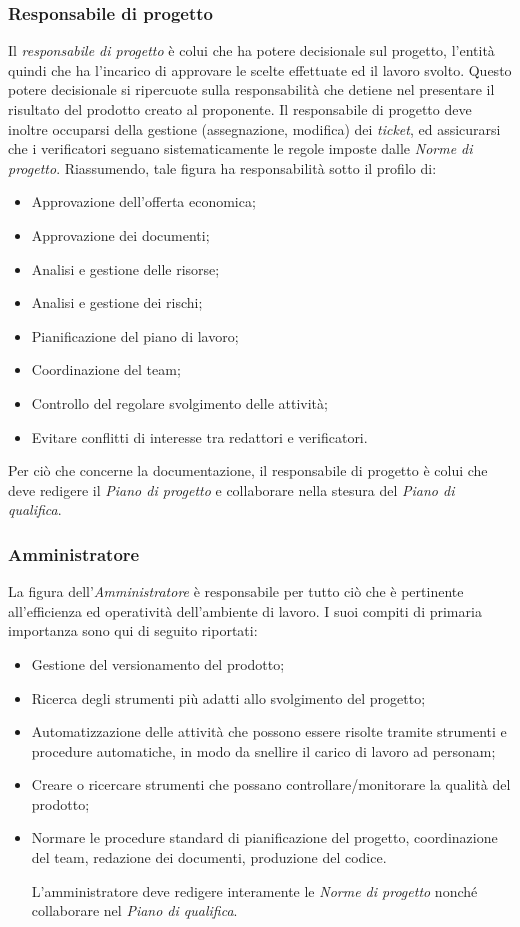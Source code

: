 \subsubsection{Responsabile di progetto}
\label{referenzaRDP}
Il \textit{responsabile di progetto} è colui che ha potere decisionale sul progetto, l'entità quindi che ha l'incarico di approvare le scelte effettuate ed il lavoro svolto. Questo potere decisionale si ripercuote sulla responsabilità che detiene nel presentare il risultato del prodotto creato al proponente.
Il responsabile di progetto deve inoltre occuparsi della gestione (assegnazione, modifica) dei \textit{ticket}, ed assicurarsi che i verificatori seguano sistematicamente le regole imposte dalle \textit{Norme di progetto}.
Riassumendo, tale figura ha responsabilità sotto il profilo di:
\begin{itemize}
\item Approvazione dell'offerta economica;
\item Approvazione dei documenti;
\item Analisi e gestione delle risorse;
\item Analisi e gestione dei rischi;
\item Pianificazione del piano di lavoro;
\item Coordinazione del team;
\item Controllo del regolare svolgimento delle attività;
\item Evitare conflitti di interesse tra redattori e verificatori.
\end{itemize}
Per ciò che concerne la documentazione, il responsabile di progetto è colui che deve redigere il \textit{Piano di progetto} e collaborare nella stesura del \textit{Piano di qualifica}.
\subsubsection{Amministratore}
La figura dell'\textit{Amministratore} è responsabile per tutto ciò che è pertinente all'efficienza ed operatività dell'ambiente di lavoro. 
I suoi compiti di primaria importanza sono qui di seguito riportati:
\begin{itemize}
\item Gestione del versionamento del prodotto;
\item Ricerca degli strumenti più adatti allo svolgimento del progetto;
\item Automatizzazione delle attività che possono essere risolte tramite strumenti e procedure automatiche, in modo da snellire il carico di lavoro ad personam;
\item Creare o ricercare strumenti che possano controllare/monitorare la qualità del prodotto;
\item Normare le procedure standard di pianificazione del progetto, coordinazione del team, redazione dei documenti, produzione del codice.

L'amministratore deve redigere interamente le \textit{Norme di progetto} nonché collaborare nel \textit{Piano di qualifica}.
\end{itemize}
